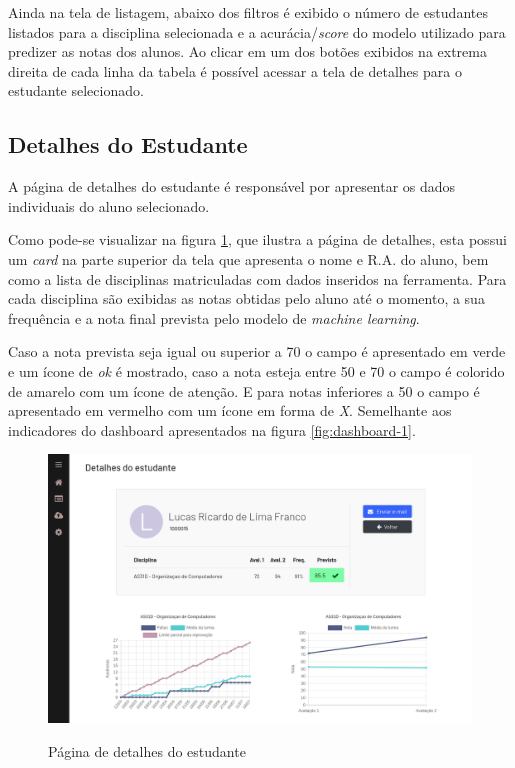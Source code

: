 Ainda na tela de listagem, abaixo dos filtros é exibido o número de estudantes listados para a disciplina selecionada e a acurácia/\textit{score} do modelo utilizado para predizer as notas dos alunos.
Ao clicar em um dos botões exibidos na extrema direita de cada linha da tabela é possível acessar a tela de detalhes para o estudante selecionado.

\subsection{Detalhes do Estudante}

A página de detalhes do estudante é responsável por apresentar os dados individuais do aluno selecionado.

Como pode-se visualizar na figura \ref{fig:sistema-detalhes-1}, que ilustra a página de detalhes, esta possui um \textit{card} na parte superior da tela que apresenta o nome e R.A. do aluno, bem como a lista de disciplinas matriculadas com dados inseridos na ferramenta. 
Para cada disciplina são exibidas as notas obtidas pelo aluno até o momento, a sua frequência e a nota final prevista pelo modelo de \textit{machine learning}.

Caso a nota prevista seja igual ou superior a 70 o campo é apresentado em verde e um ícone de \textit{ok} é mostrado, caso a nota esteja entre 50 e 70 o campo é colorido de amarelo com um ícone de atenção.
E para notas inferiores a 50 o campo é apresentado em vermelho com um ícone em forma de \textit{X}.
Semelhante aos indicadores do dashboard apresentados na figura \ref{fig:dashboard-1}.

\begin{figure}[!htb]
    \centering
    \caption{Página de detalhes do estudante}
    \includegraphics[width=1\textwidth]{./dados/figuras/sistema/sistema-detalhes-1}
    \label{fig:sistema-detalhes-1}
\end{figure}

